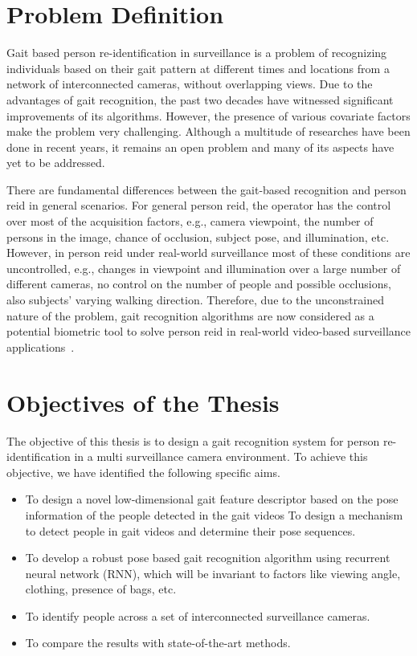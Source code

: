 \section{Problem Definition}
Gait based person re-identification in surveillance is a problem of recognizing individuals based on their gait pattern at different times and locations from a network of interconnected cameras, without overlapping views. Due to the advantages of gait recognition, the past two decades have witnessed significant improvements of its algorithms.  However, the presence of various covariate factors make the problem very challenging. Although a multitude of researches have been done in recent years, it remains an open problem and many of its aspects have yet to be addressed.

There are fundamental differences between the gait-based recognition and person \gls{reid} in general scenarios. For general person \gls{reid}, the operator has the control over most of the acquisition factors, e.g., camera viewpoint, the number of persons in the image, chance of occlusion, subject pose, and illumination, etc. However, in person \gls{reid} under real-world surveillance most of these conditions are uncontrolled, e.g., changes in viewpoint and illumination over a large number of different cameras, no control on the number of people and possible occlusions, also subjects’ varying walking direction. Therefore, due to the unconstrained nature of the problem, gait recognition algorithms are now considered as a potential biometric tool to solve person \gls{reid} in real-world video-based surveillance applications~\cite{Lee_14}.




\section{Objectives of the Thesis}
The objective of this thesis is to design a gait recognition system for person re-identification in a multi surveillance camera environment. To achieve this objective, we have identified the following specific aims.

\begin{itemize}
\item To design a novel low-dimensional gait feature descriptor based on the pose information of the people detected in the gait videos To design a mechanism to detect people in gait videos and determine their pose sequences. 

\item To develop a robust pose based gait recognition algorithm using recurrent neural network (RNN), which will be invariant to factors like viewing angle, clothing, presence of bags, etc.

\item To identify people across a set of interconnected surveillance cameras.

\item To compare the results with state-of-the-art methods.
\end{itemize}



